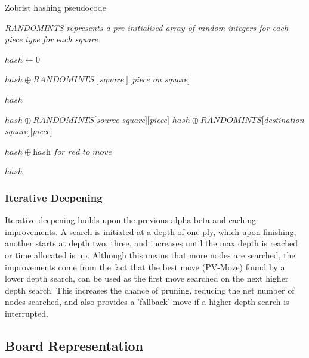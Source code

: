 \documentclass[../main/main.tex]{subfiles}
\begin{document}
\begin{algorithm}[H]
\caption{Zobrist hashing pseudocode}
\begin{algorithmic}
    \item \textit{RANDOMINTS represents a pre-initialised array of random integers for each piece type for each square}
    
    \bigskip

        \State $hash \gets 0$

                \State $hash \oplus RANDOMINTS[square][$\textit{piece on square}$]$
            \EndIf
        \EndFor
        
        \State \Return $hash$
    \EndFunction

    \bigskip

        \State $hash \oplus RANDOMINTS[$\textit{source square}$][$\textit{piece}$]$
        \State $hash \oplus RANDOMINTS[$\textit{destination square}$][$\textit{piece}$]$

            \State $hash \oplus \textit{hash for red to move}$ 
        \EndIf
        
        \State \Return $hash$
    \EndFunction
\end{algorithmic}
\end{algorithm}

\subsubsection*{Iterative Deepening}
Iterative deepening builds upon the previous alpha-beta and caching improvements. A search is initiated at a depth of one ply, which upon finishing, another starts at depth two, three, and increases until the max depth is reached or time allocated is up. Although this means that more nodes are searched, the improvements come from the fact that the best move (PV-Move) found by a lower depth search, can be used as the first move searched on the next higher depth search. This increases the chance of pruning, reducing the net number of nodes searched, and also provides a 'fallback' move if a higher depth search is interrupted.

\subsection{Board Representation}
\end{document}
